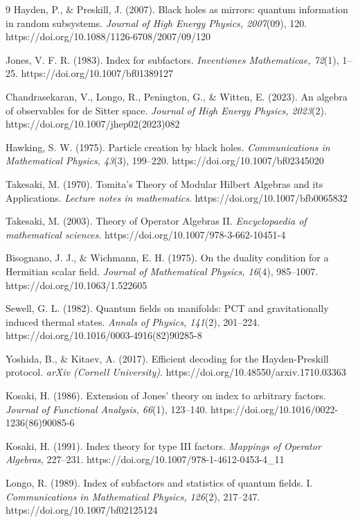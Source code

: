 \documentclass[a4paper,11pt]{article}
\begin{document}
\begin{thebibliography}{9}
Hayden, P., \& Preskill, J. (2007). Black holes as mirrors: quantum information in random subsystems. \emph{Journal of High Energy Physics, 2007}(09), 120. https://doi.org/10.1088/1126-6708/2007/09/120

Jones, V. F. R. (1983). Index for subfactors. \emph{Inventiones Mathematicae, 72}(1), 1–25. https://doi.org/10.1007/bf01389127

Chandrasekaran, V., Longo, R., Penington, G., \& Witten, E. (2023). An algebra of observables for de Sitter space. \emph{Journal of High Energy Physics, 2023}(2). https://doi.org/10.1007/jhep02(2023)082

Hawking, S. W. (1975). Particle creation by black holes. \emph{Communications in Mathematical Physics, 43}(3), 199–220. https://doi.org/10.1007/bf02345020

Takesaki, M. (1970). Tomita’s Theory of Modular Hilbert Algebras and its Applications. \emph{Lecture notes in mathematics}. https://doi.org/10.1007/bfb0065832

Takesaki, M. (2003). Theory of Operator Algebras II. \emph{Encyclopaedia of mathematical sciences}. https://doi.org/10.1007/978-3-662-10451-4

Bisognano, J. J., \& Wichmann, E. H. (1975). On the duality condition for a Hermitian scalar field. \emph{Journal of Mathematical Physics, 16}(4), 985–1007. https://doi.org/10.1063/1.522605

Sewell, G. L. (1982). Quantum fields on manifolds: PCT and gravitationally induced thermal states. \emph{Annals of Physics, 141}(2), 201–224. https://doi.org/10.1016/0003-4916(82)90285-8

Yoshida, B., \& Kitaev, A. (2017). Efficient decoding for the Hayden-Preskill protocol. \emph{arXiv (Cornell University)}. https://doi.org/10.48550/arxiv.1710.03363

Kosaki, H. (1986). Extension of Jones’ theory on index to arbitrary factors. \emph{Journal of Functional Analysis, 66}(1), 123–140. https://doi.org/10.1016/0022-1236(86)90085-6

Kosaki, H. (1991). Index theory for type III factors. \emph{Mappings of Operator Algebras}, 227–231. https://doi.org/10.1007/978-1-4612-0453-4\_11

Longo, R. (1989). Index of subfactors and statistics of quantum fields. I. \emph{Communications in Mathematical Physics, 126}(2), 217–247. https://doi.org/10.1007/bf02125124


\end{thebibliography}
\end{document}
